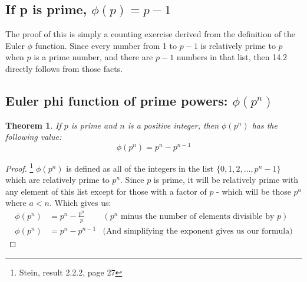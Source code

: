 \documentclass[10pt]{article}
\newtheorem{theorem}{Theorem}
\theoremstyle{definition}
\theoremstyle{remark}
\begin{document}
\subsection{If p is prime, $\phi(p) = p-1$}
The proof of this is simply a counting exercise derived from the definition of the Euler $\phi$ function.  Since every number from 1 to $p-1$ is relatively prime to $p$ when $p$ is a prime number, and there are $p-1$ numbers in that list, then 14.2 directly follows from those facts.
\subsection{Euler phi function of prime powers: $\phi(p^n)$}
\begin{theorem}\label{euler_phi_prime_power}
If $p$ is prime and $n$ is a positive integer, then $\phi(p^n)$ has the following value:
$$\phi(p^n) = p^n - p^{n-1}$$
\end{theorem}
\begin{proof}\footnote{Stein, result 2.2.2, page 27}
$\phi(p^n)$ is defined as all of the integers in the list $\{0,1,2,\ldots,p^n-1\}$ which are relatively prime to $p^n$.  Since $p$ is prime, it will be relatively prime with any element of this list except for those with a factor of $p$ - which will be those $p^a$ where $a < n$.  Which gives us:
\begin{align*}
\phi(p^n) &= p^n - \frac{p^n}{p} &(\text{$p^n$ minus the number of elements divisible by $p$})\\
\phi(p^n) &= p^n - p^{n-1}  &(\text{And simplifying the exponent gives us our formula)}
\end{align*}
\end{proof}
\end{document}

